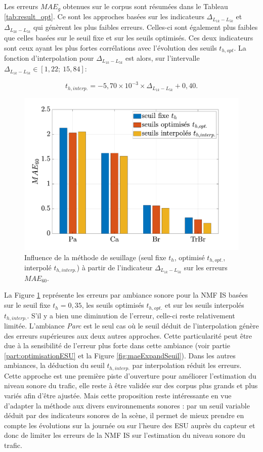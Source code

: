 Les erreurs $MAE_g$ obtenues sur le corpus sont résumées dans le Tableau \ref{tab:result_opt}.
Ce sont les approches basées sur les indicateurs $\Delta_{L_{1k}-L_{5k}}$ et $\Delta_{L_{2k}-L_{5k}}$ qui génèrent les plus faibles erreurs. Celles-ci sont également plus faibles que celles basées sur le seuil fixe et sur les seuils optimisés. Ces deux indicateurs sont ceux ayant les plus fortes corrélations avec l'évolution des seuils $t_{h,opt}$.
La fonction d'interpolation pour $\Delta_{L_{1k}-L_{5k}}$ est alors, sur l'intervalle $\Delta_{L_{1k}-L_{5k}} \in\left[1,22;~ 15,84 \right]$: 

\begin{equation}
t_{h,interp.} = -5,70\times 10^{-3} \times \Delta_{L_{1k}-L_{5k}} +0,40.
\end{equation}

\begin{figure}[h]
\centering
\includegraphics[width=.7\linewidth]{./figures/resultats/erreursSeuilOpt.pdf}
\caption{Influence de la méthode de seuillage (seul fixe $t_h$, optimisé $t_{h,opt.}$, interpolé $t_{h,interp.}$) à partir de l'indicateur $\Delta_{L_{1k}-L_{5k}}$ sur les erreurs $MAE_{60}$.}
\label{fig:erreurInterp}
\end{figure}

La Figure \ref{fig:erreurInterp} représente les erreurs par ambiance sonore pour la NMF IS basées sur le seuil fixe $t_h = 0,35$, les seuils optimisés $t_{h,opt.}$ et sur les seuils interpolés $t_{h,interp.}$. S'il y a bien une diminution de l'erreur, celle-ci reste relativement limitée. L'ambiance \textit{Parc} est le seul cas où le seuil déduit de l'interpolation génère des erreurs supérieures aux deux autres approches. Cette particularité peut être due à la sensibilité de l'erreur plus forte dans cette ambiance (voir partie \ref{part:optimisationESU} et la Figure \ref{fig:maeExpandSeuil}). Dans les autres ambiances, la déduction du seuil $t_{h,interp.}$ par interpolation réduit les erreurs. \\

Cette approche est une première piste d'ouverture pour améliorer l'estimation du niveau sonore du trafic, elle reste à être validée sur des corpus plus grands et plus variés afin d'être ajustée. 
Mais cette proposition reste intéressante en vue d'adapter la méthode aux divers environnements sonores : par un seuil variable déduit par des indicateurs sonores de la scène, il permet de mieux prendre en compte les évolutions sur la journée ou sur l'heure des ESU auprès du capteur et donc de limiter les erreurs de la NMF IS sur l'estimation du niveau sonore du trafic.
